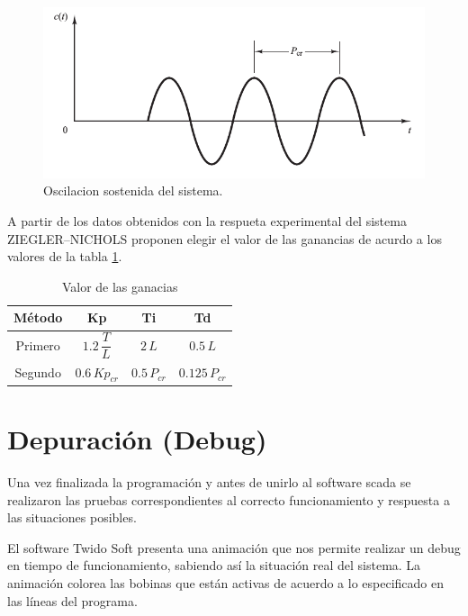 \begin{figure}
 \centering
 \includegraphics[scale=0.5]{Cap4-ProgramacionPLC/images/segundometodo.png}
 \caption{Oscilacion sostenida del sistema.}
 \label{fig:segundometodo}
\end{figure}

A partir de los datos obtenidos con la respueta experimental del sistema
ZIEGLER–NICHOLS proponen elegir el valor de las ganancias de acurdo a los
valores de la tabla \ref{table:valorganancias}.


\begin{table}[!t]

\renewcommand{\arraystretch}{1.3}
\centering
\begin{tabular}{c||c||c |c}
\hline
\bfseries Método & \bfseries Kp  & \bfseries Ti & \bfseries Td\\
\hline \hline
Primero &  $ 1.2 \, \dfrac{T}{L}$ & $2 \, L $ & $ 0.5 \, L $\\
\hline
Segundo &  $0.6 \,Kp_{cr}  $ & $ 0.5 \, P_{cr}$ & $0.125 \, P_{cr} $\\
\hline
\end{tabular}
\caption{Valor de las ganacias}
\label{table:valorganancias}
\end{table}


\section{Depuración (Debug)}
\label{sec:Debug}


Una vez finalizada la programación y antes de unirlo al software \gls{scada} 
se realizaron las pruebas correspondientes al correcto funcionamiento y respuesta
a las situaciones posibles. 

El software Twido Soft presenta una animación que nos permite realizar un debug en
tiempo de funcionamiento, sabiendo así la situación real del sistema. 
La animación colorea las bobinas que están activas de acuerdo a lo especificado
en las líneas del programa.

